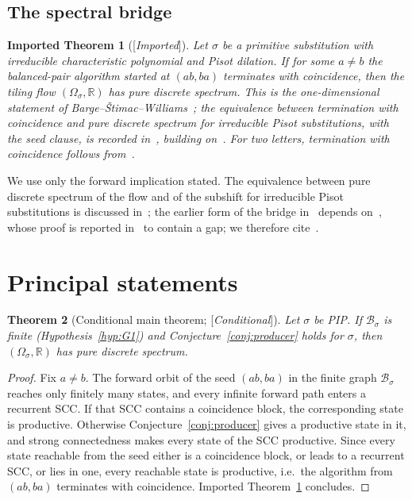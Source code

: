 \documentclass[11pt]{amsart}
\theoremstyle{plain}
\newtheorem{theorem}{Theorem}[section]
\newtheorem{importedtheorem}[theorem]{Imported Theorem}
\theoremstyle{definition}
\theoremstyle{remark}
\newcommand{\R}{\mathbb{R}}
\newcommand{\B}{\mathcal{B}}
\newcommand{\PDS}{pure discrete spectrum}
\newcommand{\Status}[1]{\textup{[\textit{#1}]}}
\begin{document}
\subsection{The spectral bridge}\label{sec:bridge}

\begin{importedtheorem}[\Status{Imported}]\label{thm:bridge}
Let $\sigma$ be a primitive substitution with irreducible characteristic polynomial and Pisot dilation. If for some $a\ne b$ the balanced-pair algorithm started at $(ab,ba)$ terminates with coincidence, then the tiling flow $(\Omega_\sigma,\R)$ has \PDS{}. This is the one-dimensional statement of Barge--\v{S}timac--Williams~\cite[Cor.~2]{BSW}; the equivalence between termination with coincidence and \PDS{} for irreducible Pisot substitutions, with the seed clause, is recorded in~\cite[Thm.~5.3]{ABBLS}, building on~\cite{SS,HS}. For two letters, termination with coincidence follows from~\cite{BD,HS}.
\end{importedtheorem}

We use only the forward implication stated. The equivalence between \PDS{} of the flow and of the subshift for irreducible Pisot substitutions is discussed in~\cite{CS,ABBLS}; the earlier form of the bridge in~\cite[Prop.~17.4]{BK} depends on~\cite[Thm.~16.3]{BK}, whose proof is reported in~\cite[\S1]{BSW} to contain a gap; we therefore cite~\cite{BSW}.

\section{Principal statements}\label{sec:principal}

\begin{theorem}[Conditional main theorem; \Status{Conditional}]\label{thm:main-conditional}
Let $\sigma$ be PIP. If $\B_\sigma$ is finite (Hypothesis~\ref{hyp:G1}) and Conjecture~\ref{conj:producer} holds for $\sigma$, then $(\Omega_\sigma,\R)$ has \PDS{}.
\end{theorem}
\begin{proof}
Fix $a\ne b$. The forward orbit of the seed $(ab,ba)$ in the finite graph $\B_\sigma$ reaches only finitely many states, and every infinite forward path enters a recurrent SCC. If that SCC contains a coincidence block, the corresponding state is productive. Otherwise Conjecture~\ref{conj:producer} gives a productive state in it, and strong connectedness makes every state of the SCC productive. Since every state reachable from the seed either is a coincidence block, or leads to a recurrent SCC, or lies in one, every reachable state is productive, i.e.\ the algorithm from $(ab,ba)$ terminates with coincidence. Imported Theorem~\ref{thm:bridge} concludes.
\end{proof}
\end{document}
